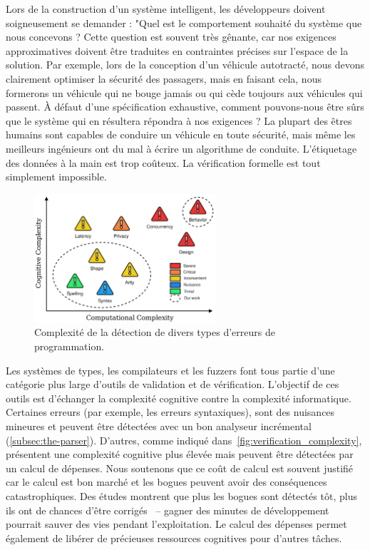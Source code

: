 Lors de la construction d'un système intelligent, les développeurs doivent soigneusement se demander : "Quel est le comportement souhaité du système que nous concevons ? Cette question est souvent très gênante, car nos exigences approximatives doivent être traduites en contraintes précises sur l'espace de la solution. Par exemple, lors de la conception d'un véhicule autotracté, nous devons clairement optimiser la sécurité des passagers, mais en faisant cela, nous formerons un véhicule qui ne bouge jamais ou qui cède toujours aux véhicules qui passent. À défaut d'une spécification exhaustive, comment pouvons-nous être sûrs que le système qui en résultera répondra à nos exigences ? La plupart des êtres humains sont capables de conduire un véhicule en toute sécurité, mais même les meilleurs ingénieurs ont du mal à écrire un algorithme de conduite. L'étiquetage des données à la main est trop coûteux. La vérification formelle est tout simplement impossible.

\begin{figure}
    \centering
    \includegraphics[width=0.60\textwidth]{../figures/verification_complexity.png}
    \caption{Complexité de la détection de divers types d'erreurs de programmation.}
    \label{fig:verification_complexity}
\end{figure}

Les systèmes de types, les compilateurs et les fuzzers font tous partie d'une catégorie plus large d'outils de validation et de vérification. L'objectif de ces outils est d'échanger la complexité cognitive contre la complexité informatique. Certaines erreurs (par exemple, les erreurs syntaxiques), sont des nuisances mineures et peuvent être détectées avec un bon analyseur incrémental (\autoref{subsec:the-parser}). D'autres, comme indiqué dans~\autoref{fig:verification_complexity}, présentent une complexité cognitive plus élevée mais peuvent être détectées par un calcul de dépenses. Nous soutenons que ce coût de calcul est souvent justifié car le calcul est bon marché et les bogues peuvent avoir des conséquences catastrophiques. Des études montrent que plus les bogues sont détectés tôt, plus ils ont de chances d'être corrigés~\citep{distefano2019scaling} -- gagner des minutes de développement pourrait sauver des vies pendant l'exploitation. Le calcul des dépenses permet également de libérer de précieuses ressources cognitives pour d'autres tâches.

